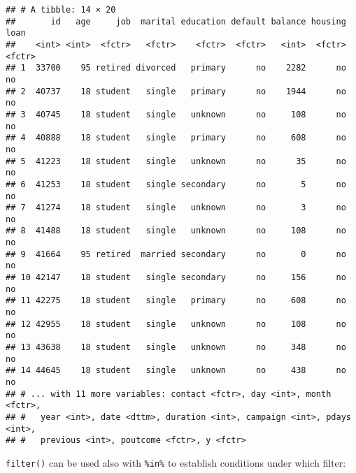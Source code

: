 \documentclass[]{book}
\newenvironment{Shaded}{\begin{snugshade}}{\end{snugshade}}
\newcommand{\KeywordTok}[1]{\textcolor[rgb]{0.13,0.29,0.53}{\textbf{{#1}}}}
\newcommand{\DecValTok}[1]{\textcolor[rgb]{0.00,0.00,0.81}{{#1}}}
\newcommand{\StringTok}[1]{\textcolor[rgb]{0.31,0.60,0.02}{{#1}}}
\newcommand{\CommentTok}[1]{\textcolor[rgb]{0.56,0.35,0.01}{\textit{{#1}}}}
\newcommand{\NormalTok}[1]{{#1}}
\begin{document}
\begin{verbatim}
## # A tibble: 14 × 20
##       id   age     job  marital education default balance housing   loan
##    <int> <int>  <fctr>   <fctr>    <fctr>  <fctr>   <int>  <fctr> <fctr>
## 1  33700    95 retired divorced   primary      no    2282      no     no
## 2  40737    18 student   single   primary      no    1944      no     no
## 3  40745    18 student   single   unknown      no     108      no     no
## 4  40888    18 student   single   primary      no     608      no     no
## 5  41223    18 student   single   unknown      no      35      no     no
## 6  41253    18 student   single secondary      no       5      no     no
## 7  41274    18 student   single   unknown      no       3      no     no
## 8  41488    18 student   single   unknown      no     108      no     no
## 9  41664    95 retired  married secondary      no       0      no     no
## 10 42147    18 student   single secondary      no     156      no     no
## 11 42275    18 student   single   primary      no     608      no     no
## 12 42955    18 student   single   unknown      no     108      no     no
## 13 43638    18 student   single   unknown      no     348      no     no
## 14 44645    18 student   single   unknown      no     438      no     no
## # ... with 11 more variables: contact <fctr>, day <int>, month <fctr>,
## #   year <int>, date <dttm>, duration <int>, campaign <int>, pdays <int>,
## #   previous <int>, poutcome <fctr>, y <fctr>
\end{verbatim}

\texttt{filter()} can be used also with \texttt{\%in\%} to establish
conditions under which filter:

\begin{Shaded}
\end{Shaded}
\end{document}
